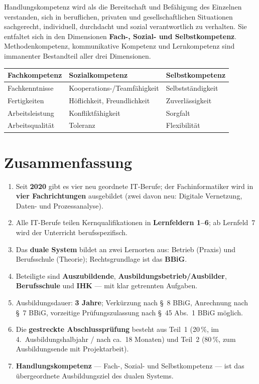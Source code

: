 \documentclass[11pt, a4paper]{article}
\begin{document}
\begin{merksatz}[title={\bfseries Handlungskompetenz (nach KMK)}]
Handlungskompetenz wird als die Bereitschaft und Befähigung des Einzelnen verstanden,
sich in beruflichen, privaten und gesellschaftlichen Situationen sachgerecht, individuell,
durchdacht und sozial verantwortlich zu verhalten. Sie entfaltet sich in den Dimensionen
\textbf{Fach-, Sozial- und Selbstkompetenz}. Methodenkompetenz, kommunikative Kompetenz
und Lernkompetenz sind immanenter Bestandteil aller drei Dimensionen.
\end{merksatz}

\begin{center}
\begin{tabular}{p{4.5cm} p{4.5cm} p{4.5cm}}
\toprule
\textbf{Fachkompetenz} & \textbf{Sozialkompetenz} & \textbf{Selbstkompetenz}\\
\midrule
Fachkenntnisse & Kooperations-/Teamfähigkeit & Selbstständigkeit\\
Fertigkeiten & Höflichkeit, Freundlichkeit & Zuverlässigkeit\\
Arbeitsleistung & Konfliktfähigkeit & Sorgfalt\\
Arbeitsqualität & Toleranz & Flexibilität\\
\bottomrule
\end{tabular}
\end{center}

\section{Zusammenfassung}

\begin{enumerate}
  \item Seit \textbf{2020} gibt es vier neu geordnete IT-Berufe; der Fachinformatiker wird in \textbf{vier Fachrichtungen} ausgebildet (zwei davon neu: Digitale Vernetzung, Daten- und Prozessanalyse).
  \item Alle IT-Berufe teilen Kernqualifikationen in \textbf{Lernfeldern 1--6}; ab Lernfeld~7 wird der Unterricht berufsspezifisch.
  \item Das \textbf{duale System} bildet an zwei Lernorten aus: Betrieb (Praxis) und Berufsschule (Theorie); Rechtsgrundlage ist das \textbf{BBiG}.
  \item Beteiligte sind \textbf{Auszubildende}, \textbf{Ausbildungsbetrieb/Ausbilder}, \textbf{Berufsschule} und \textbf{IHK} --- mit klar getrennten Aufgaben.
  \item Ausbildungsdauer: \textbf{3 Jahre}; Verkürzung nach §~8 BBiG, Anrechnung nach §~7 BBiG, vorzeitige Prüfungszulassung nach §~45 Abs.~1 BBiG möglich.
  \item Die \textbf{gestreckte Abschlussprüfung} besteht aus Teil~1 (20\,\%, im 4.~Ausbildungshalbjahr / nach ca.\ 18 Monaten) und Teil~2 (80\,\%, zum Ausbildungsende mit Projektarbeit).
  \item \textbf{Handlungskompetenz} --- Fach-, Sozial- und Selbstkompetenz --- ist das übergeordnete Ausbildungsziel des dualen Systems.
\end{enumerate}
\end{document}
